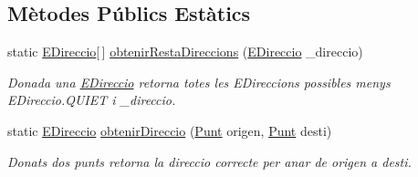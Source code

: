 \subsection*{Mètodes Públics Estàtics}
\begin{DoxyCompactItemize}
\item 
static \hyperlink{enumlogica_1_1enumeracions_1_1_e_direccio}{E\+Direccio}\mbox{[}$\,$\mbox{]} \hyperlink{enumlogica_1_1enumeracions_1_1_e_direccio_af6ac9782e0bdc64a00fa578a6baa591e}{obtenir\+Resta\+Direccions} (\hyperlink{enumlogica_1_1enumeracions_1_1_e_direccio}{E\+Direccio} \+\_\+direccio)
\begin{DoxyCompactList}\small\item\em Donada una \hyperlink{enumlogica_1_1enumeracions_1_1_e_direccio}{E\+Direccio} retorna totes les E\+Direccions possibles menys E\+Direccio.\+Q\+U\+I\+E\+T i \+\_\+direccio. \end{DoxyCompactList}\item 
static \hyperlink{enumlogica_1_1enumeracions_1_1_e_direccio}{E\+Direccio} \hyperlink{enumlogica_1_1enumeracions_1_1_e_direccio_a7457407bffa5aa784ca1ca8c8b50b136}{obtenir\+Direccio} (\hyperlink{classlogica_1_1_punt}{Punt} origen, \hyperlink{classlogica_1_1_punt}{Punt} desti)
\begin{DoxyCompactList}\small\item\em Donats dos punts retorna la direccio correcte per anar de origen a desti. \end{DoxyCompactList}\end{DoxyCompactItemize}
